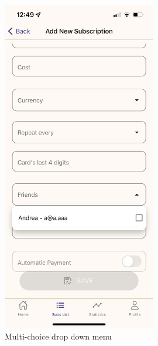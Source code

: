 \documentclass[11pt]{article}
\begin{document}
\begin{figure}[h!]
\begin{minipage}[c]{0.45\textwidth}
        \includegraphics[width=0.6\textwidth, clip]{../../assets/smartphone/addDrop.PNG}
        \caption{Multi-choice drop down menu}
        \label{fig:addDrop}
    \end{minipage}
\end{figure}
\end{document}
